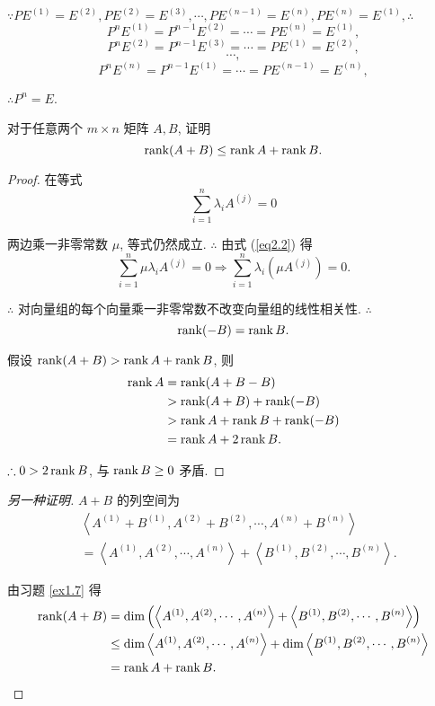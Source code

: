 \documentclass[color=black,device=normal,lang=cn,mode=geye]{elegantnote}
\begin{document}
\begin{solution}
    $\because PE^{(1)}=E^{(2)},PE^{(2)}=E^{(3)},\cdots,PE^{(n-1)}=E^{(n)},PE^{(n)}=E^{(1)},\therefore$
    \[P^{n}E^{(1)}=P^{n-1}E^{(2)}=\cdots=PE^{(n)}=E^{(1)},\]
    \[P^{n}E^{(2)}=P^{n-1}E^{(3)}=\cdots=PE^{(1)}=E^{(2)},\]
    \[\cdots,\]
    \[P^{n}E^{(n)}=P^{n-1}E^{(1)}=\cdots=PE^{(n-1)}=E^{(n)},\]

    $\therefore P^n=E$.
\end{solution}
\begin{exercise}%
    对于任意两个 $m\times n$ 矩阵 $A,B$, 证明
    \[\operatorname{rank} (A+B)\leq\operatorname{rank} A+\operatorname{rank} B.\]
\end{exercise}
\begin{proof}
    在等式
    \begin{equation}\label{eq2.2}
        \sum\limits_{i=1}^n\lambda_iA^{(j)}=0
    \end{equation}

    两边乘一非零常数 $\mu$, 等式仍然成立. $\therefore$ 由式 (\ref{eq2.2}) 得
    \[\sum\limits_{i=1}^n\mu\lambda_iA^{(j)}=0\Rightarrow\sum\limits_{i=1}^n\lambda_i(\mu A^{(j)})=0.\]

    $\therefore$ 对向量组的每个向量乘一非零常数不改变向量组的线性相关性. $\therefore$
    \[\operatorname{rank} (-B)=\operatorname{rank} B.\]

    假设 $\operatorname{rank}(A+B)>\operatorname{rank} A+\operatorname{rank} B$, 则
    \begin{align*}
        \operatorname{rank} A & =\operatorname{rank} (A+B-B) \\
        & >\operatorname{rank} (A+B)+\operatorname{rank} (-B) \\
        & >\operatorname{rank} A+\operatorname{rank} B+\operatorname{rank} (-B) \\
        & =\operatorname{rank} A+2\operatorname{rank} B.
    \end{align*}

    $\therefore 0>2\operatorname{rank} B$, 与 $\operatorname{rank} B\geq0$ 矛盾.
\end{proof}
\begin{proof}[另一种证明]
    $A+B$ 的列空间为
    \begin{align*}
        & \left<A^{(1)}+B^{(1)},A^{(2)}+B^{(2)},\cdots,A^{(n)}+B^{(n)}\right> \\
        & =\left<A^{(1)},A^{(2)},\cdots,A^{(n)}\right>+\left<B^{(1)},B^{(2)},\cdots,B^{(n)}\right>.
    \end{align*}

    由习题 \ref{ex1.7} 得
    \begin{align*}
        \operatorname{rank}(A+B) & =\dim\left(\left<A^{(1)},A^{(2)},\cdots,A^{(n)}\right>+\left<B^{(1)},B^{(2)},\cdots,B^{(n)}\right>\right) \\
        & \leq\dim\left<A^{(1)},A^{(2)},\cdots,A^{(n)}\right>+\dim\left<B^{(1)},B^{(2)},\cdots,B^{(n)}\right> \\
        & =\operatorname{rank} A+\operatorname{rank} B. \qedhere
    \end{align*}
\end{proof}
\end{document}
